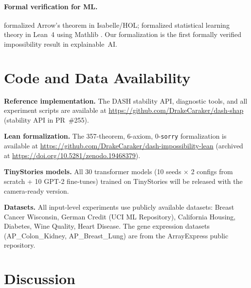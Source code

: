 \documentclass{article}
\begin{document}
\paragraph{Formal verification for ML.}
\begin{sloppypar}
\citet{nipkow2009social} formalized Arrow's theorem in Isabelle/HOL; \citet{zhang2026statistical} formalized statistical learning theory in Lean~4 \citep{demoura2021lean4} using Mathlib \citep{mathlib2020}. Our formalization is the first formally verified impossibility result in explainable~AI.
\end{sloppypar}

\endgroup%

\section{Code and Data Availability}
\label{sec:code-availability}

\begin{sloppypar}
\noindent\textbf{Reference implementation.} The DASH stability API, diagnostic tools, and all experiment scripts are available at \url{https://github.com/DrakeCaraker/dash-shap} (stability API in PR~\#255).

\noindent\textbf{Lean formalization.} The 357-theorem, 6-axiom, 0-\texttt{sorry} formalization is available at \url{https://github.com/DrakeCaraker/dash-impossibility-lean} (archived at \url{https://doi.org/10.5281/zenodo.19468379}).

\noindent\textbf{TinyStories models.} All 30 transformer models (10 seeds $\times$ 2 configs from scratch + 10 GPT-2 fine-tunes) trained on TinyStories \citep{eldan2023tinystories} will be released with the camera-ready version.

\noindent\textbf{Datasets.} All input-level experiments use publicly available datasets: Breast Cancer Wisconsin, German Credit (UCI ML Repository), California Housing, Diabetes, Wine Quality, Heart Disease. The gene expression datasets (AP\_Colon\_Kidney, AP\_Breast\_Lung) are from the ArrayExpress public repository.
\end{sloppypar}


\section{Discussion}
\label{sec:discussion}
\end{document}
